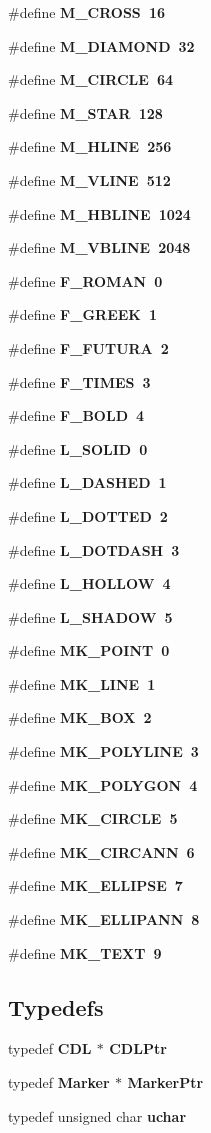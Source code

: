 \begin{CompactItemize}
\#define \bf{M\_\-CROSS}~16
\item 
\#define \bf{M\_\-DIAMOND}~32
\item 
\#define \bf{M\_\-CIRCLE}~64
\item 
\#define \bf{M\_\-STAR}~128
\item 
\#define \bf{M\_\-HLINE}~256
\item 
\#define \bf{M\_\-VLINE}~512
\item 
\#define \bf{M\_\-HBLINE}~1024
\item 
\#define \bf{M\_\-VBLINE}~2048
\item 
\#define \bf{F\_\-ROMAN}~0
\item 
\#define \bf{F\_\-GREEK}~1
\item 
\#define \bf{F\_\-FUTURA}~2
\item 
\#define \bf{F\_\-TIMES}~3
\item 
\#define \bf{F\_\-BOLD}~4
\item 
\#define \bf{L\_\-SOLID}~0
\item 
\#define \bf{L\_\-DASHED}~1
\item 
\#define \bf{L\_\-DOTTED}~2
\item 
\#define \bf{L\_\-DOTDASH}~3
\item 
\#define \bf{L\_\-HOLLOW}~4
\item 
\#define \bf{L\_\-SHADOW}~5
\item 
\#define \bf{MK\_\-POINT}~0
\item 
\#define \bf{MK\_\-LINE}~1
\item 
\#define \bf{MK\_\-BOX}~2
\item 
\#define \bf{MK\_\-POLYLINE}~3
\item 
\#define \bf{MK\_\-POLYGON}~4
\item 
\#define \bf{MK\_\-CIRCLE}~5
\item 
\#define \bf{MK\_\-CIRCANN}~6
\item 
\#define \bf{MK\_\-ELLIPSE}~7
\item 
\#define \bf{MK\_\-ELLIPANN}~8
\item 
\#define \bf{MK\_\-TEXT}~9
\end{CompactItemize}
\subsection*{Typedefs}
\begin{CompactItemize}
\item 
typedef \bf{CDL} $\ast$ \bf{CDLPtr}
\item 
typedef \bf{Marker} $\ast$ \bf{Marker\-Ptr}
\item 
typedef unsigned char \bf{uchar}
\end{CompactItemize}

